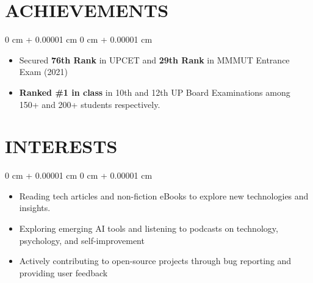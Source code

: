\documentclass[10pt, letterpaper]{article}
\newenvironment{onecolentry}{
    \begin{adjustwidth}{
        0 cm + 0.00001 cm
    }{
        0 cm + 0.00001 cm
    }
}{
    \end{adjustwidth}
} %
\begin{document}
    \section{ACHIEVEMENTS}
        \vspace{0.2 cm}
        
        \begin{onecolentry}
            \begin{itemize}[leftmargin=*,noitemsep,topsep=0pt]
                \item Secured \textbf{76th Rank} in UPCET and \textbf{29th Rank} in MMMUT Entrance Exam (2021)
                \item \textbf{Ranked \#1 in class} in 10th and 12th UP Board Examinations among 150+ and 200+ students respectively.
            \end{itemize}
        \end{onecolentry}

    \section{INTERESTS}
        \vspace{0.2 cm}
        
        \begin{onecolentry}
            \begin{itemize}[leftmargin=*,noitemsep,topsep=0pt]
                \item Reading tech articles and non-fiction eBooks to explore new technologies and insights.
                \item Exploring emerging AI tools and listening to podcasts on technology, psychology, and self-improvement
                \item Actively contributing to open-source projects through bug reporting and providing user feedback
            \end{itemize}
        \end{onecolentry}
\end{document}
